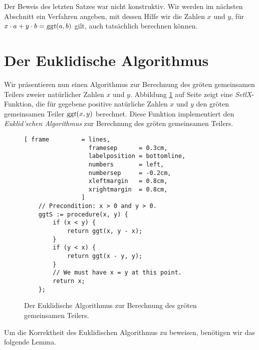 \remark
Der Beweis des letzten Satzes war nicht konstruktiv.  Wir werden im n\"{a}chsten Abschnitt ein
Verfahren angeben, mit dessen Hilfe wir die Zahlen $x$ und $y$, f\"{u}r 
$x \cdot a + y \cdot b = \textsl{ggt}(a, b)$ gilt, auch tats\"{a}chlich berechnen k\"{o}nnen.


\section{Der Euklidische Algorithmus}
Wir pr\"{a}sentieren nun einen Algorithmus zur Berechnung des gr\"{o}\3ten gemeinsamen 
Teilers zweier nat\"{u}rlicher Zahlen $x$ und $y$.
 Abbildung \ref{fig:ggt.stlx} auf Seite \pageref{fig:ggt.stlx} zeigt eine
\textsl{SetlX}-Funktion, die f\"{u}r gegebene positive nat\"{u}rliche Zahlen $x$ und $y$ den gr\"{o}\3ten gemeinsamen  Teiler 
$\textsl{ggt}(x,y)$ berechnet.  Diese Funktion implementiert den \emph{Euklid'schen
Algorithmus} zur Berechnung des gr\"{o}\3ten gemeinsamen Teilers.


\begin{figure}[!ht]
\centering
\begin{Verbatim}[ frame         = lines, 
                  framesep      = 0.3cm, 
                  labelposition = bottomline,
                  numbers       = left,
                  numbersep     = -0.2cm,
                  xleftmargin   = 0.8cm,
                  xrightmargin  = 0.8cm,
                ]
    // Precondition: x > 0 and y > 0.
    ggtS := procedure(x, y) {
        if (x < y) {
            return ggt(x, y - x);
        }
        if (y < x) {
            return ggt(x - y, y); 
        }
        // We must have x = y at this point.
        return x;
    };
\end{Verbatim}
\vspace*{-0.3cm}
\caption{Der Euklidische Algorithmus zur Berechnung des gr\"{o}\3ten gemeinsamen Teilers.}
\label{fig:ggt.stlx}
\end{figure}

Um die Korrektheit des Euklidischen Algorithmus zu beweisen, ben\"{o}tigen wir das folgende Lemma.

